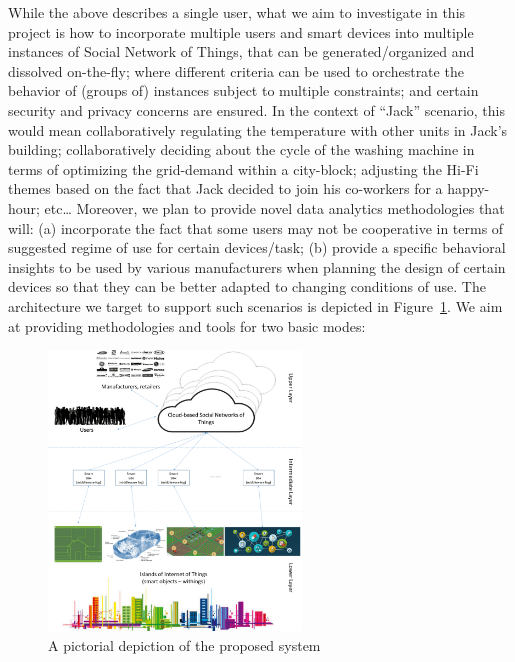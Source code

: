 While the above describes a single user, what we aim to investigate in this project is how to incorporate multiple users and smart devices into multiple instances of Social Network of Things, that can be generated/organized and dissolved on-the-fly; where different criteria can be used to orchestrate the behavior of (groups of) instances subject to multiple constraints; and certain security and privacy concerns are ensured. In the context of “Jack” scenario, this would mean collaboratively regulating the temperature with other units in Jack’s building; collaboratively deciding about the cycle of the washing machine in terms of optimizing the grid-demand within a city-block; adjusting the Hi-Fi themes based on the fact that Jack decided to join his co-workers for a happy-hour; etc… Moreover, we plan to provide novel data analytics methodologies that will: (a) incorporate the fact that some users may not be cooperative in terms of suggested regime of use for certain devices/task; (b) provide a specific behavioral insights to be used by various manufacturers when planning the design of certain devices so that they can be better adapted to changing conditions of use. 
The architecture we target to support such  scenarios is depicted in Figure~\ref{fig1}. We aim at providing methodologies and tools for two basic modes: \\

\begin{figure} \vspace{-3mm}
	\centerline{\includegraphics[width=0.60\textwidth]{./fig1.png}}
	\vspace{-3mm} \caption{\small A pictorial depiction of the proposed system}
	\label{fig1}
	\vspace{-3mm}
\end{figure}

